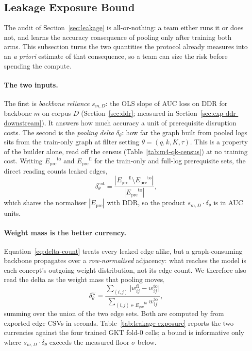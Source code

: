 \documentclass[preprint,10pt,doubleblind]{elsarticle}
\newcommand{\Epre}{\ensuremath{E_{\text{pre}}}}
\newcommand{\DDR}{\textsc{DDR}}
\begin{document}
\subsection{Leakage Exposure Bound}
\label{sec:exposure}
The audit of Section~\ref{sec:leakage} is all-or-nothing: a team either runs it
or does not, and learns the accuracy consequence of pooling only after training
both arms. This subsection turns the two quantities the protocol already
measures into an \emph{a priori} estimate of that consequence, so a team can
size the risk before spending the compute.

\paragraph{The two inputs.}
The first is \emph{backbone reliance}
$s_{m,D}$: the OLS slope of AUC loss on \DDR{} for backbone $m$ on corpus $D$
(Section~\ref{sec:ddr}; measured in Section~\ref{sec:exp-ddr-downstream}). It
answers how much accuracy a unit of prerequisite disruption costs. The second is
the \emph{pooling delta} $\delta_\theta$: how far the graph built from pooled
logs sits from the train-only graph at filter setting
$\theta=(q,k,K,\tau)$. This is a property of the builder alone, read off the
census (Table~\ref{tab:m4-qk-census}) at no training cost. Writing
$\Epre^{\mathrm{to}}$ and $\Epre^{\mathrm{fl}}$ for the train-only and full-log
prerequisite sets, the direct reading counts leaked edges,
\begin{equation}
\delta^{\mathrm{cnt}}_\theta
  = \frac{|\Epre^{\mathrm{fl}}\setminus\Epre^{\mathrm{to}}|}
         {|\Epre^{\mathrm{to}}|},
\label{eq:delta-count}
\end{equation}
which shares the normaliser $|\Epre|$ with \DDR{}, so the product
$s_{m,D}\cdot\delta_\theta$ is in AUC units.

\paragraph{Weight mass is the better currency.}
Equation~\eqref{eq:delta-count} treats every leaked edge alike, but a
graph-consuming backbone propagates over a \emph{row-normalised} adjacency: what
reaches the model is each concept's outgoing weight distribution, not its edge
count. We therefore also read the delta as the weight mass that pooling moves,
\begin{equation}
\delta^{\mathrm{w}}_\theta
  = \frac{\sum_{(i,j)}\big|w^{\mathrm{fl}}_{ij}-w^{\mathrm{to}}_{ij}\big|}
         {\sum_{(i,j)\in\Epre^{\mathrm{to}}} w^{\mathrm{to}}_{ij}},
\label{eq:delta-weight}
\end{equation}
summing over the union of the two edge sets. Both are computed by
 from exported edge CSVs in seconds.
Table~\ref{tab:leakage-exposure} reports the two currencies against the four
trained GKT fold-0 cells; a bound is informative only where
$s_{m,D}\cdot\delta_\theta$ exceeds the measured floor $\sigma$ below.
\end{document}
